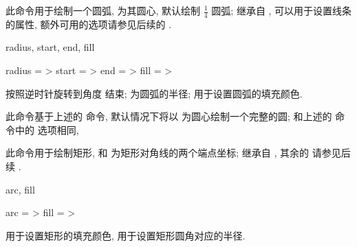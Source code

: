 \documentclass[
  hyper, lang=cn, 
  class=l3dox, 
]{../../zlatex/code/ztex}
\begin{document}
\begin{function}[added=2025-05-13]{\zarc}
  \begin{syntax}
  \end{syntax}
  此命令用于绘制一个圆弧, \texttt{} 为其圆心, 默认绘制 $\frac{1}{4}$ 圆弧; 
   继承自 , 
  可以用于设置线条的属性, 额外可用的选项请参见后续的 .
\end{function}


\begin{keyval}[parent=ztool/../zarc]{radius, start, end, fill}
  \begin{syntax}
    radius = >
    start  = >
    end    = >
    fill   = >
  \end{syntax}
   按照逆时针旋转到角度  结束;  为圆弧的半径;
   用于设置圆弧的填充颜色.
\end{keyval}


\begin{function}[added=2025-05-13]{\zcircle}
  \begin{syntax}
  \end{syntax}
  此命令基于上述的  命令, 默认情况下将以 \texttt{} 为圆心绘制一个完整的圆;
   和上述的  命令中的  选项相同,
\end{function}


\begin{function}[added=2025-05-13]{\zrectangle}
  \begin{syntax}
  \end{syntax}
  此命令用于绘制矩形, \texttt{} 和 \texttt{} 为矩形对角线的两个端点坐标;
   继承自 , 其余的  
  请参见后续 .
\end{function}


\begin{keyval}[parent=ztool/../zrectangle]{arc, fill}
  \begin{syntax}
    arc  = >
    fill = >
  \end{syntax}
   用于设置矩形的填充颜色,  用于设置矩形圆角对应的半径.
\end{keyval}
\end{document}
